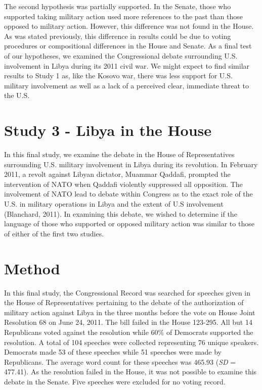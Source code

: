 \documentclass[english,man]{apa6}
\theoremstyle{definition}
\theoremstyle{definition}
\theoremstyle{definition}
\theoremstyle{remark}
\begin{document}
The second hypothesis was partially supported. In the Senate, those who
supported taking military action used more references to the past than
those opposed to military action. However, this difference was not found
in the House. As was stated previously, this difference in results could
be due to voting procedures or compositional differences in the House
and Senate. As a final test of our hypotheses, we examined the
Congressional debate surrounding U.S. involvement in Libya during its
2011 civil war. We might expect to find similar results to Study 1 as,
like the Kosovo war, there was less support for U.S. military
involvement as well as a lack of a perceived clear, immediate threat to
the U.S.

\section{Study 3 - Libya in the
House}\label{study-3---libya-in-the-house}

In this final study, we examine the debate in the House of
Representatives surrounding U.S. military involvement in Libya during
its revolution. In February 2011, a revolt against Libyan dictator,
Muammar Qaddafi, prompted the intervention of NATO when Qaddafi
violently suppressed all opposition. The involvement of NATO lead to
debate within Congress as to the exact role of the U.S. in military
operations in Libya and the extent of U.S involvement (Blanchard, 2011).
In examining this debate, we wished to determine if the language of
those who supported or opposed military action was similar to those of
either of the first two studies.

\section{Method}\label{method-5}

In this final study, the Congressional Record was searched for speeches
given in the House of Representatives pertaining to the debate of the
authorization of military action against Libya in the three months
before the vote on House Joint Resolution 68 on June 24, 2011. The bill
failed in the House 123-295. All but 14 Republicans voted against the
resolution while 60\% of Democrats supported the resolution. A total of
104 speeches were collected representing 76 unique speakers. Democrats
made 53 of these speeches while 51 speeches were made by Republicans.
The average word count for these speeches was 465.93 (\emph{SD} =
477.41). As the resolution failed in the House, it was not possible to
examine this debate in the Senate. Five speeches were excluded for no
voting record.
\end{document}
